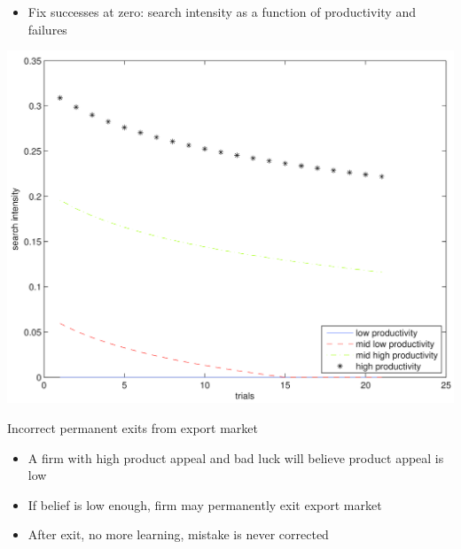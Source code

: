 \documentclass[notes=show]{beamer}
\begin{document}
\begin{frame}%


\begin{itemize}
\item Fix successes at zero: search intensity as a function of productivity and failures
\end{itemize}

\includegraphics[scale=0.07]{figs/baseline_policy_no_suc_2d.png}

\end{frame}%

\begin{frame}{Incorrect permanent exits from export market}

    \begin{itemize}
        \item A firm with high product appeal and bad luck will believe product appeal is low
        \item If belief is low enough, firm may permanently exit export market
        \item After exit, no more learning, mistake is never corrected
    \end{itemize}

\end{frame}
\end{document}

